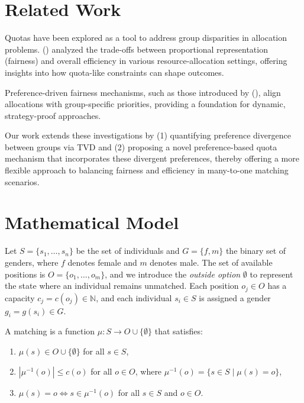 \documentclass[letterpaper]{article}
\newcommand{\citet}[1]{\citeauthor{#1} (\citeyear{#1})}
\begin{document}
\section{Related Work}

Quotas have been explored as a tool to address group disparities in allocation problems. 
\citet{Bertsimas2012OnTE} analyzed the trade-offs between proportional representation (fairness) and overall efficiency in various resource-allocation settings, offering insights into how quota-like constraints can shape outcomes. 

Preference-driven fairness mechanisms, such as those introduced by \citet{AzizW14}, align allocations with group-specific priorities, providing a foundation for dynamic, strategy-proof approaches.

Our work extends these investigations by (1) quantifying preference divergence between groups via 
TVD and (2) proposing a novel preference-based quota mechanism that 
incorporates these divergent preferences, thereby offering a more flexible approach to balancing 
fairness and efficiency in many-to-one matching scenarios.


\section{Mathematical Model}

Let \( S = \{s_1, \ldots, s_n\} \) be the set of individuals and \( G = \{f, m\} \) the binary set of genders, where \( f \) denotes female and \( m \) denotes male. The set of available positions is \( O = \{o_1, \ldots, o_m\} \), and we introduce the \textit{outside option} \( \emptyset \) to represent the state where an individual remains unmatched. Each position \( o_j \in O \) has a capacity \( c_j = c(o_j) \in \mathbb{N} \), and each individual \( s_i \in S \) is assigned a gender \( g_i = g(s_i) \in G \).

A matching is a function \( \mu : S \to O \cup \{\emptyset\} \) that satisfies:
\begin{enumerate}
    \item \( \mu(s) \in O \cup \{\emptyset\} \) for all \( s \in S \),
    \item  \( |\mu^{-1}(o)| \leq c(o) \) for all \( o \in O \), where \( \mu^{-1}(o) = \{ s \in S \mid \mu(s) = o \} \),
    \item \( \mu(s) = o \iff s \in \mu^{-1}(o) \) for all \( s \in S \) and \( o \in O \).
\end{enumerate}
\end{document}
